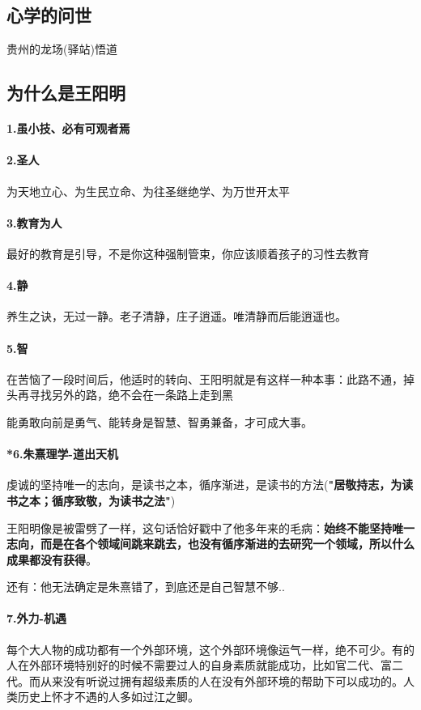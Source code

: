 \documentclass[UTF8,a4paper,8pt]{ctexbook}
\begin{document}
		 \subsection{心学的问世}
			 贵州的龙场(驿站)悟道
			 
		 \subsection{为什么是王阳明}
			 \paragraph{1.虽小技、必有可观者焉}
			 \paragraph{2.圣人}
				 为天地立心、为生民立命、为往圣继绝学、为万世开太平
			 \paragraph{3.教育为人}
				 最好的教育是引导，不是你这种强制管束，你应该顺着孩子的习性去教育
			 \paragraph{4.静}
				 养生之诀，无过一静。老子清静，庄子逍遥。唯清静而后能逍遥也。
			 \paragraph{5.智}
				 在苦恼了一段时间后，他适时的转向、王阳明就是有这样一种本事：此路不通，掉头再寻找另外的路，绝不会在一条路上走到黑
				 
				 能勇敢向前是勇气、能转身是智慧、智勇兼备，才可成大事。	
			 \paragraph{*6.朱熹理学-道出天机}
				 虔诚的坚持唯一的志向，是读书之本，循序渐进，是读书的方法(\textbf{"居敬持志，为读书之本；循序致敬，为读书之法"})	
				 
				 王阳明像是被雷劈了一样，这句话恰好戳中了他多年来的毛病：\textbf{始终不能坚持唯一志向，而是在各个领域间跳来跳去，也没有循序渐进的去研究一个领域，所以什么成果都没有获得}。
				 
				 还有：他无法确定是朱熹错了，到底还是自己智慧不够..
				 
			 \paragraph{7.外力-机遇}
				 每个大人物的成功都有一个外部环境，这个外部环境像运气一样，绝不可少。有的人在外部环境特别好的时候不需要过人的自身素质就能成功，比如官二代、富二代。而从来没有听说过拥有超级素质的人在没有外部环境的帮助下可以成功的。人类历史上怀才不遇的人多如过江之鲫。
					
\end{document}
